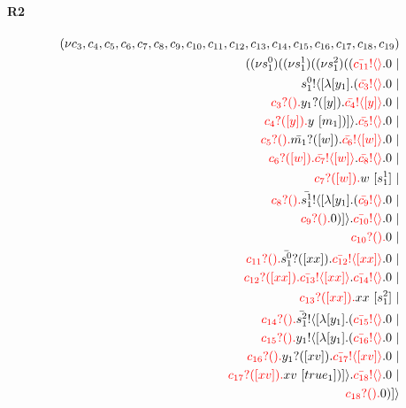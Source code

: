 \documentclass{article}
\begin{document}
\paragraph{R2}
\begin{align*}
 (\nu c_{3},c_{4},c_{5},c_{6},c_{7},c_{8},c_{9},c_{10},c_{11},c_{12},c_{13},c_{14},c_{15},c_{16},c_{17},c_{18},c_{19}) \\ ( (\nu s^{0}_{1})( (\nu s^{1}_{1})( (\nu s^{2}_{1})((\color{red}\bar{c_{11}}! \langle  \rangle \color{black}.0  \ | \\ \color{black}s^{0}_{1}! \langle [ \lambda [y_{1}].(\color{red}\bar{c_{3}}! \langle  \rangle \color{black}.0  \ | \\ \color{red}c_{3}?().\color{black}\color{black}y_{1}?([y]).\color{black}\color{red}\bar{c_{4}}! \langle [y] \rangle \color{black}.0  \ | \\ \color{red}c_{4}?([y]).\color{black}y \ [m_{1}])] \rangle \color{black}.\color{red}\bar{c_{5}}! \langle  \rangle \color{black}.0  \ | \\ \color{red}c_{5}?().\color{black}\color{black}\bar{m_{1}}?([w]).\color{black}\color{red}\bar{c_{6}}! \langle [w] \rangle \color{black}.0  \ | \\ \color{red}c_{6}?([w]).\color{black}\color{red}\bar{c_{7}}! \langle [w] \rangle \color{black}.\color{red}\bar{c_{8}}! \langle  \rangle \color{black}.0  \ | \\ \color{red}c_{7}?([w]).\color{black}w \ [s^{1}_{1}] \ | \\ \color{red}c_{8}?().\color{black}\color{black}\bar{s^{1}_{1}}! \langle [ \lambda [y_{1}].(\color{red}\bar{c_{9}}! \langle  \rangle \color{black}.0  \ | \\ \color{red}c_{9}?().\color{black}0 )] \rangle \color{black}.\color{red}\bar{c_{10}}! \langle  \rangle \color{black}.0  \ | \\ \color{red}c_{10}?().\color{black}0  \ | \\ \color{red}c_{11}?().\color{black}\color{black}\bar{s^{0}_{1}}?([xx]).\color{black}\color{red}\bar{c_{12}}! \langle [xx] \rangle \color{black}.0  \ | \\ \color{red}c_{12}?([xx]).\color{black}\color{red}\bar{c_{13}}! \langle [xx] \rangle \color{black}.\color{red}\bar{c_{14}}! \langle  \rangle \color{black}.0  \ | \\ \color{red}c_{13}?([xx]).\color{black}xx \ [s^{2}_{1}] \ | \\ \color{red}c_{14}?().\color{black}\color{black}\bar{s^{2}_{1}}! \langle [ \lambda [y_{1}].(\color{red}\bar{c_{15}}! \langle  \rangle \color{black}.0  \ | \\ \color{red}c_{15}?().\color{black}\color{black}y_{1}! \langle [ \lambda [y_{1}].(\color{red}\bar{c_{16}}! \langle  \rangle \color{black}.0  \ | \\ \color{red}c_{16}?().\color{black}\color{black}y_{1}?([xv]).\color{black}\color{red}\bar{c_{17}}! \langle [xv] \rangle \color{black}.0  \ | \\ \color{red}c_{17}?([xv]).\color{black}xv \ [true_{1}])] \rangle \color{black}.\color{red}\bar{c_{18}}! \langle  \rangle \color{black}.0  \ | \\ \color{red}c_{18}?().\color{black}0 )] \rangle 
\end{align*}
\end{document}
